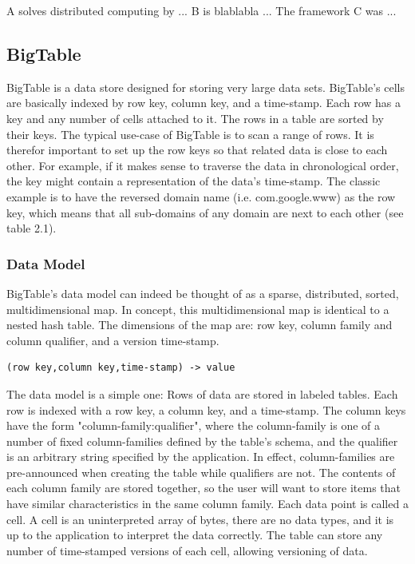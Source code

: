 A solves distributed computing by ...
B is blablabla ...
The framework C was ...


\subsection{BigTable}

BigTable is a data store designed for storing very large data sets. BigTable's
cells are basically indexed by row key, column key, and a time-stamp. Each row
has a key and any number of cells attached to it. The rows in a table are sorted
by their keys. The typical use-case of BigTable is to scan a range of rows. It
is therefor important to set up the row keys so that related data is close to
each other. For example, if it makes sense to traverse the data in chronological
order, the key might contain a representation of the data's time-stamp. The
classic example is to have the reversed domain name (i.e. com.google.www) as the
row key, which means that all sub-domains of any domain are next to each other
(see table 2.1).


\subsubsection{Data Model}

BigTable's data model can indeed be thought of as a sparse, distributed, sorted,
multidimensional map. In concept, this multidimensional map is identical to a
nested hash table. The dimensions of the map are: row key, column family and
column qualifier, and a version time-stamp.

\vspace{12pt}

\begin{lstlisting}[caption=BigTable data model illustration.,captionpos=b]
   (row key,column key,time-stamp) -> value
\end{lstlisting}

\vspace{12pt}

The data model is a simple one: Rows of data are stored in labeled tables. Each
row is indexed with a row key, a column key, and a time-stamp. The column keys
have the form "column-family:qualifier", where the column-family is one of a
number of fixed column-families defined by the table's schema, and the qualifier
is an arbitrary string specified by the application. In effect, column-families
are pre-announced when creating the table while qualifiers are not. The contents
of each column family are stored together, so the user will want to store items
that have similar characteristics in the same column family. Each data point is
called a cell. A cell is an uninterpreted array of bytes, there are no data
types, and it is up to the application to interpret the data correctly. The
table can store any number of time-stamped versions of each cell, allowing
versioning of data.

